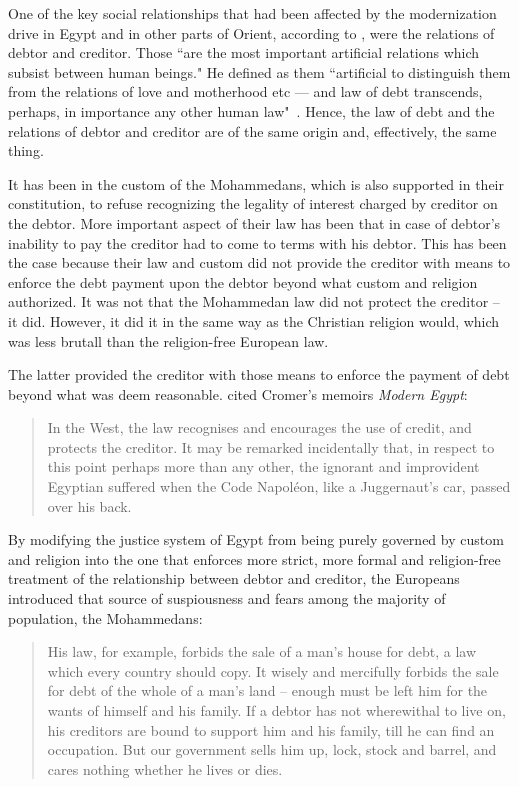 One of the key social relationships that had been affected by the modernization drive in Egypt and in other parts of Orient, according to \citeauthor{innes1909}, were the relations of debtor and creditor. Those ``are the most important artificial relations which subsist between human beings." He defined as them ``artificial to distinguish them from the relations of love and motherhood etc --- and law of debt transcends, perhaps, in importance any other human law"~\citep[p.~16]{innes1909}.\label{debt_credit_relation} Hence, the law of debt and the relations of debtor and creditor are of the same origin and, effectively, the same thing. 

It has been in the custom of the Mohammedans, which is also supported in their constitution, to refuse recognizing the legality of interest charged by creditor on the debtor. More important aspect of their law has been that in case of debtor's inability to pay the creditor had to come to terms with his debtor. This has been the case because their law and custom did not provide the creditor with means to enforce the debt payment upon the debtor beyond what custom and religion authorized. It was not that the Mohammedan law did not protect the creditor -- it did. However, it did it in the same way as the Christian religion would, which was less brutall than the religion-free European law. 

The latter provided the creditor with those means to enforce the payment of debt beyond what was deem reasonable. \citeauthor{innes1909} cited Cromer's memoirs \textit{Modern Egypt}: 

\begin{quote}
In the West, the law recognises and encourages the use of credit, and protects the creditor. It may be remarked incidentally that, in respect to this point perhaps more than any other, the ignorant and improvident Egyptian suffered when the Code Napol{\'e}on, like a Juggernaut's car, passed over his back.~\citep[p.~162]{cromer1908_}
\end{quote}

By modifying the justice system of Egypt from being purely governed by custom and religion into the one that enforces more strict, more formal and religion-free treatment of the relationship between debtor and creditor, the Europeans introduced that source of suspiousness and fears among the majority of population, the Mohammedans: 

\begin{quote}
His law, for example, forbids the sale of a man's house for debt, a law which every country should copy. It wisely and mercifully forbids the sale for debt of the whole of a man's land  -- enough must be left him for the wants of himself and his family. If a debtor has not wherewithal to live on, his creditors are bound to support him and his family, till he can find an occupation. But our government sells him up, lock, stock and barrel, and cares nothing whether he lives or dies.~\citep[pp.~15-16]{innes1909}
\end{quote}

